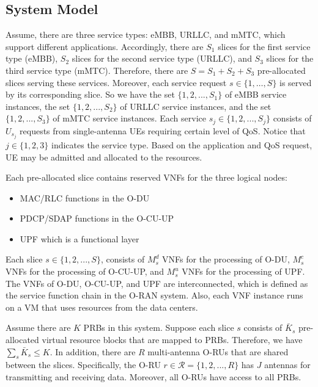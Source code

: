 \documentclass[lettersize,journal]{IEEEtran}
\begin{document}
\subsection{System Model}
\vspace{-1mm}
Assume, there are three service types: eMBB, URLLC, and mMTC, which support different applications. Accordingly, there are $S_1$ slices for the first service type (eMBB), $S_2$ slices for the second service type (URLLC), and $S_3$ slices for the third service type (mMTC).
Therefore, there are $S = S_1 + S_2 + S_3$ pre-allocated slices serving these services.
Moreover, each service request $s\in \{1,\ldots,S\}$ is served by its corresponding slice. So we have the set
$\{1,2,...,S_1\}$ of eMBB service instances, the set $\{1,2,...,S_2\}$ of URLLC service instances, and the set
$\{1,2,...,S_3\}$ of mMTC service instances.
Each service $s_j\in \{1,2,...,S_j\} $ consists of $U_{s_j}$ requests from  single-antenna UEs requiring certain level of QoS. Notice that $j \in \{1,2,3\}$ indicates the service type.
Based on the application and QoS request, UE may be admitted and allocated to the resources.

Each pre-allocated slice contains reserved VNFs for the three logical nodes:
\begin{itemize}
\item MAC/RLC functions in the O-DU 
\item PDCP/SDAP functions in the O-CU-UP
\item UPF which is a functional layer
\end{itemize}
Each slice $s \in \{1,2,...,S \}$, consists of  $M_s^{d}$ VNFs for the processing of O-DU, $M_s^{c}$ VNFs for the processing of O-CU-UP, and $M_s^{u}$ VNFs for the processing of UPF.
The VNFs of O-DU, O-CU-UP, and UPF are interconnected, which is defined as the service function chain in the O-RAN system. Also, each VNF instance runs on a VM that uses resources from the data centers.


Assume there are $K$ PRBs in this system. Suppose each slice $s$ consists of $\bar{K}_s$ pre-allocated virtual resource blocks that are mapped to PRBs. Therefore, we have $\sum_s \bar{K}_s \leq K$.
In addition, there are $R$ multi-antenna O-RUs that are shared between the slices. Specifically, the O-RU $r \in \mathcal{R}=\{1,2,...,R \}$ has $J$ antennas for transmitting and receiving data. Moreover, all O-RUs have access to all PRBs.
\vspace{-3mm}
\end{document}
